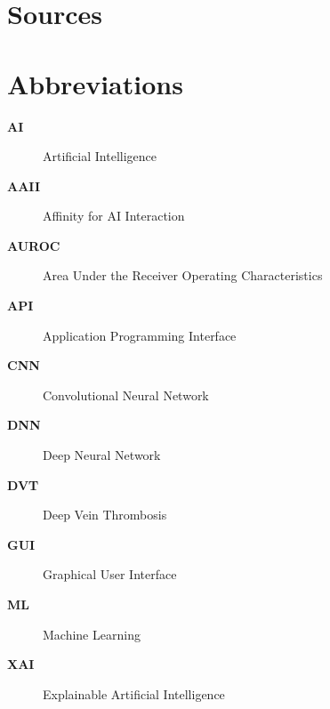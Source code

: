 {}
\listoffigures
\clearpage

{}
\listoftables
\clearpage

{}
\renewcommand*{\listlistingname}{List of Source Codes}
\listoflistings
\clearpage

{}
\chapter*{Sources}

\printbibliography[heading=subbibintoc, nottype=online, nottype=software]

\printbibliography[heading=subbibintoc, type=online, title=Websites]

\printbibliography[heading=subbibintoc, type=software, title=Software]

\clearpage

{}
\chapter*{Abbreviations}
\begin{description}
    \item [\textbf{AI}] Artificial Intelligence
    \item [\textbf{AAII}] Affinity for AI Interaction
    \item [\textbf{AUROC}] Area Under the Receiver Operating Characteristics
    \item [\textbf{API}] Application Programming Interface
    \item [\textbf{CNN}] Convolutional Neural Network
    \item [\textbf{DNN}] Deep Neural Network
    \item [\textbf{DVT}] Deep Vein Thrombosis
    \item [\textbf{GUI}] Graphical User Interface
    \item [\textbf{ML}] Machine Learning
    \item [\textbf{XAI}] Explainable Artificial Intelligence
\end{description}
\clearpage


